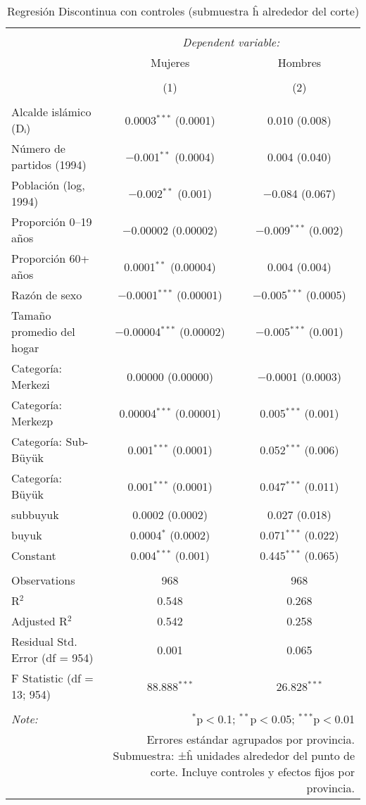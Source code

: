 \documentclass[
]{article}
\begin{document}
\begin{table}[ht!] \centering 
  \caption{Regresión Discontinua con controles (submuestra ĥ alrededor del corte)} 
  \label{tab:rd_submuestra_h_mujeres_hombres} 
\begin{tabular}{@{\extracolsep{5pt}}lcc} 
\\[-1.8ex]\hline 
\hline \\[-1.8ex] 
 & \multicolumn{2}{c}{\textit{Dependent variable:}} \\ 
\cline{2-3} 
 & Mujeres & Hombres \\ 
\\[-1.8ex] & (1) & (2)\\ 
\hline \\[-1.8ex] 
 Alcalde islámico (Dᵢ) & 0.0003$^{***}$ (0.0001) & 0.010 (0.008) \\ 
  Número de partidos (1994) & $-$0.001$^{**}$ (0.0004) & 0.004 (0.040) \\ 
  Población (log, 1994) & $-$0.002$^{**}$ (0.001) & $-$0.084 (0.067) \\ 
  Proporción 0–19 años & $-$0.00002 (0.00002) & $-$0.009$^{***}$ (0.002) \\ 
  Proporción 60+ años & 0.0001$^{**}$ (0.00004) & 0.004 (0.004) \\ 
  Razón de sexo & $-$0.0001$^{***}$ (0.00001) & $-$0.005$^{***}$ (0.0005) \\ 
  Tamaño promedio del hogar & $-$0.00004$^{***}$ (0.00002) & $-$0.005$^{***}$ (0.001) \\ 
  Categoría: Merkezi & 0.00000 (0.00000) & $-$0.0001 (0.0003) \\ 
  Categoría: Merkezp & 0.00004$^{***}$ (0.00001) & 0.005$^{***}$ (0.001) \\ 
  Categoría: Sub-Büyük & 0.001$^{***}$ (0.0001) & 0.052$^{***}$ (0.006) \\ 
  Categoría: Büyük & 0.001$^{***}$ (0.0001) & 0.047$^{***}$ (0.011) \\ 
  subbuyuk & 0.0002 (0.0002) & 0.027 (0.018) \\ 
  buyuk & 0.0004$^{*}$ (0.0002) & 0.071$^{***}$ (0.022) \\ 
  Constant & 0.004$^{***}$ (0.001) & 0.445$^{***}$ (0.065) \\ 
 \hline \\[-1.8ex] 
Observations & 968 & 968 \\ 
R$^{2}$ & 0.548 & 0.268 \\ 
Adjusted R$^{2}$ & 0.542 & 0.258 \\ 
Residual Std. Error (df = 954) & 0.001 & 0.065 \\ 
F Statistic (df = 13; 954) & 88.888$^{***}$ & 26.828$^{***}$ \\ 
\hline 
\hline \\[-1.8ex] 
\textit{Note:}  & \multicolumn{2}{r}{$^{*}$p$<$0.1; $^{**}$p$<$0.05; $^{***}$p$<$0.01} \\ 
 & \multicolumn{2}{r}{Errores estándar agrupados por provincia. Submuestra: ±ĥ unidades alrededor del punto de corte. Incluye controles y efectos fijos por provincia.} \\ 
\end{tabular} 
\end{table}
\end{document}
